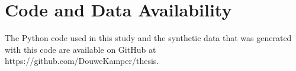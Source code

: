 \section*{Code and Data Availability}\label{Data}
The Python code used in this study and the synthetic data that was generated with this code are available on GitHub at https://github.com/DouweKamper/thesis. %
